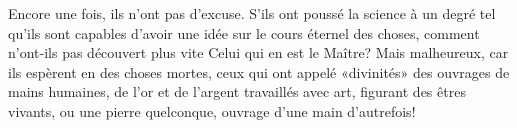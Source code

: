 Encore une fois, ils n’ont pas d’excuse.
S’ils ont poussé la science à un degré tel
	qu’ils sont capables d’avoir une idée sur le cours éternel des choses,
	comment n’ont-ils pas découvert plus vite Celui qui en est le Maître?
Mais malheureux, car ils espèrent en des choses mortes,
	ceux qui ont appelé «divinités» des ouvrages de mains humaines,
	de l’or et de l’argent travaillés avec art, figurant des êtres vivants,
	ou une pierre quelconque, ouvrage d’une main d’autrefois!
